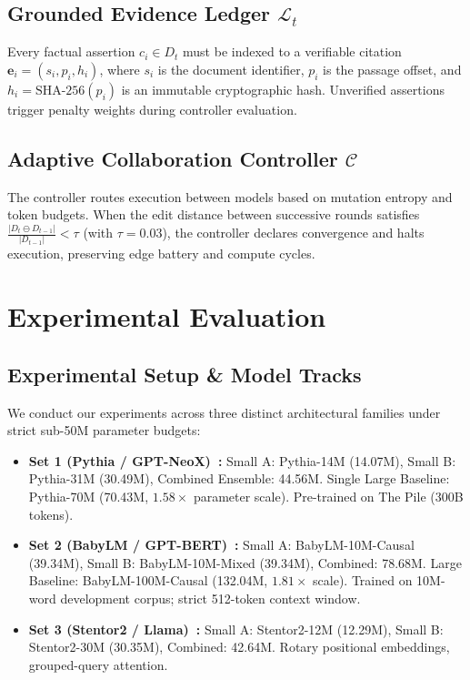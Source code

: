 \documentclass[10pt,journal,compsoc]{IEEEtran}
\begin{document}
\subsection{Grounded Evidence Ledger $\mathcal{L}_t$}
Every factual assertion $c_i \in D_t$ must be indexed to a verifiable citation $\mathbf{e}_i = (s_i, p_i, h_i)$, where $s_i$ is the document identifier, $p_i$ is the passage offset, and $h_i = \text{SHA-256}(p_i)$ is an immutable cryptographic hash. Unverified assertions trigger penalty weights during controller evaluation.

\subsection{Adaptive Collaboration Controller $\mathcal{C}$}
The controller routes execution between models based on mutation entropy and token budgets. When the edit distance between successive rounds satisfies $\frac{|D_t \ominus D_{t-1}|}{|D_{t-1}|} < \tau$ (with $\tau = 0.03$), the controller declares convergence and halts execution, preserving edge battery and compute cycles.

\section{Experimental Evaluation}

\subsection{Experimental Setup \& Model Tracks}
We conduct our experiments across three distinct architectural families under strict sub-50M parameter budgets:
\begin{itemize}
    \item \textbf{Set 1 (Pythia / GPT-NeoX)~\cite{biderman2023pythia}:} Small A: Pythia-14M (14.07M), Small B: Pythia-31M (30.49M), Combined Ensemble: 44.56M. Single Large Baseline: Pythia-70M (70.43M, $1.58\times$ parameter scale). Pre-trained on The Pile (300B tokens).
    \item \textbf{Set 2 (BabyLM / GPT-BERT)~\cite{warstadt2023findings}:} Small A: BabyLM-10M-Causal (39.34M), Small B: BabyLM-10M-Mixed (39.34M), Combined: 78.68M. Large Baseline: BabyLM-100M-Causal (132.04M, $1.81\times$ scale). Trained on 10M-word development corpus; strict 512-token context window.
    \item \textbf{Set 3 (Stentor2 / Llama)~\cite{touvron2023llama}:} Small A: Stentor2-12M (12.29M), Small B: Stentor2-30M (30.35M), Combined: 42.64M. Rotary positional embeddings, grouped-query attention.
\end{itemize}
\end{document}
